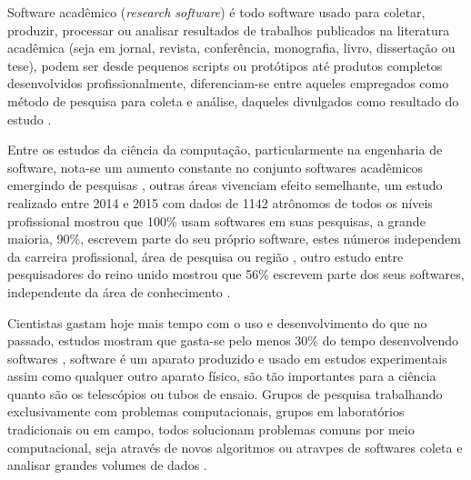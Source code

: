 

Software acadêmico ({\it research software}) é todo software usado para
coletar, produzir, processar ou analisar resultados de trabalhos publicados na
literatura acadêmica (seja em jornal, revista, conferência, monografia, livro,
dissertação ou tese), podem ser desde pequenos scripts ou protótipos até
produtos completos desenvolvidos profissionalmente, diferenciam-se entre
aqueles empregados como método de pesquisa para coleta e análise, daqueles
divulgados como resultado do estudo .


Entre os estudos da ciência da computação, particularmente na engenharia de
software, nota-se um aumento constante no conjunto softwares acadêmicos
emergindo de pesquisas \cite{allen2017engineering}, outras áreas vivenciam
efeito semelhante, um estudo realizado entre 2014 e 2015 com dados de 1142
atrônomos de todos os níveis profissional mostrou que 100\% usam softwares em
suas pesquisas, a grande maioria, 90\%, escrevem parte do seu próprio software,
estes números independem da carreira profissional, área de pesquisa ou região
\cite{momcheva2015software}, outro estudo entre pesquisadores do reino unido
mostrou que 56\% escrevem parte dos seus softwares, independente da área de
conhecimento \cite{hettrick_2014_14809}.

Cientistas gastam hoje mais tempo com o uso e desenvolvimento do que no
passado, estudos mostram que gasta-se pelo menos 30\% do tempo desenvolvendo
softwares \cite{wilson2014best}, software é um aparato produzido e usado em
estudos experimentais assim como qualquer outro aparato físico, são tão
importantes para a ciência quanto são os telescópios ou tubos de ensaio.
Grupos de pesquisa trabalhando exclusivamente com problemas computacionais,
grupos em laboratórios tradicionais ou em campo, todos solucionam problemas
comuns por meio computacional, seja através de novos algoritmos ou atravpes de
softwares coleta e analisar grandes volumes de dados \cite{wilson2014best}.

